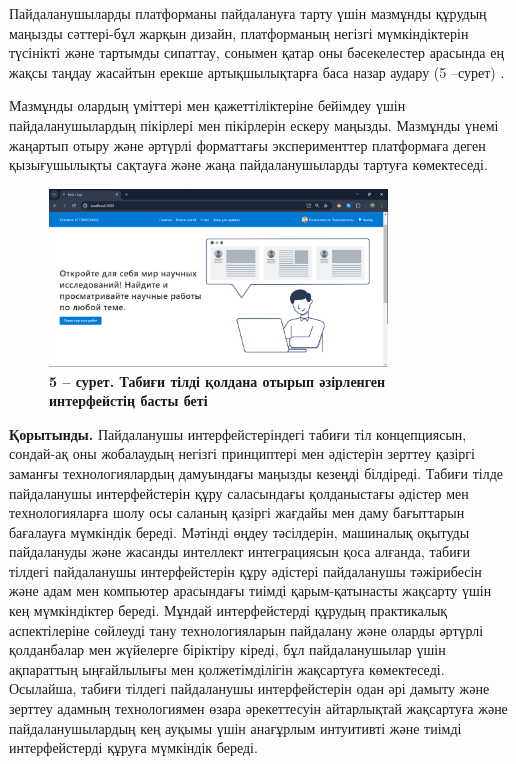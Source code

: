\begin{multicols}{2}
Пайдаланушыларды платформаны пайдалануға тарту үшін мазмұнды құрудың
маңызды сәттері-бұл жарқын дизайн, платформаның негізгі мүмкіндіктерін
түсінікті және тартымды сипаттау, сонымен қатар оны бәсекелестер
арасында ең жақсы таңдау жасайтын ерекше артықшылықтарға баса назар
аудару (5 --сурет) .

Мазмұнды олардың үміттері мен қажеттіліктеріне бейімдеу үшін
пайдаланушылардың пікірлері мен пікірлерін ескеру маңызды. Мазмұнды
үнемі жаңартып отыру және әртүрлі форматтағы эксперименттер платформаға
деген қызығушылықты сақтауға және жаңа пайдаланушыларды тартуға
көмектеседі.
\end{multicols}



\begin{figure}[H]
	\centering
	\includegraphics[width=0.8\textwidth]{assets/146}
	\caption*{\bfseries 5 -- сурет. Табиғи тілді қолдана отырып әзірленген интерфейстің
  басты беті}
\end{figure}

\begin{multicols}{2}

{\bfseries Қорытынды.} Пайдаланушы интерфейстеріндегі табиғи тіл
концепциясын, сондай-ақ оны жобалаудың негізгі принциптері мен әдістерін
зерттеу қазіргі заманғы технологиялардың дамуындағы маңызды кезеңді
білдіреді. Табиғи тілде пайдаланушы интерфейстерін құру саласындағы
қолданыстағы әдістер мен технологияларға шолу осы саланың қазіргі
жағдайы мен даму бағыттарын бағалауға мүмкіндік береді. Мәтінді өңдеу
тәсілдерін, машиналық оқытуды пайдалануды және жасанды интеллект
интеграциясын қоса алғанда, табиғи тілдегі пайдаланушы интерфейстерін
құру әдістері пайдаланушы тәжірибесін және адам мен компьютер арасындағы
тиімді қарым-қатынасты жақсарту үшін кең мүмкіндіктер береді. Мұндай
интерфейстерді құрудың практикалық аспектілеріне сөйлеуді тану
технологияларын пайдалану және оларды әртүрлі қолданбалар мен жүйелерге
біріктіру кіреді, бұл пайдаланушылар үшін ақпараттың ыңғайлылығы мен
қолжетімділігін жақсартуға көмектеседі. Осылайша, табиғи тілдегі
пайдаланушы интерфейстерін одан әрі дамыту және зерттеу адамның
технологиямен өзара әрекеттесуін айтарлықтай жақсартуға және
пайдаланушылардың кең ауқымы үшін анағұрлым интуитивті және тиімді
интерфейстерді құруға мүмкіндік береді.
\end{multicols}


